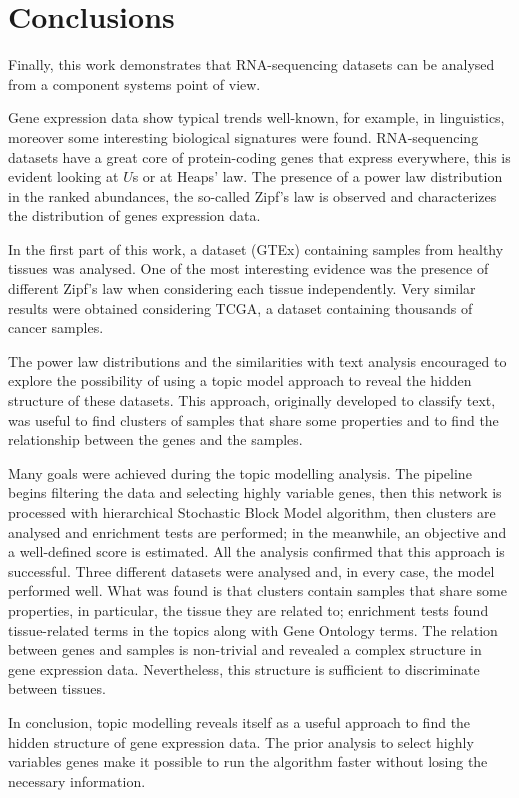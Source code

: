 \chapter{Conclusions}\label{ch:conclusions}
Finally, this work demonstrates that RNA-sequencing datasets can be analysed from a component systems point of view.

Gene expression data show typical trends well-known, for example, in linguistics, moreover some interesting biological signatures were found. RNA-sequencing datasets have a great core of protein-coding genes that express everywhere, this is evident looking at $U$s or at Heaps' law. The presence of a power law distribution in the ranked abundances, the so-called Zipf's law is observed and characterizes the distribution of genes expression data.

In the first part of this work, a dataset (GTEx) containing samples from healthy tissues was analysed. One of the most interesting evidence was the presence of different Zipf's law when considering each tissue independently. Very similar results were obtained considering TCGA, a dataset containing thousands of cancer samples.

The power law distributions and the similarities with text analysis encouraged to explore the possibility of using a topic model approach to reveal the hidden structure of these datasets. This approach, originally developed to classify text, was useful to find clusters of samples that share some properties and to find the relationship between the genes and the samples.

Many goals were achieved during the topic modelling analysis. The pipeline begins filtering the data and selecting highly variable genes, then this network is processed with hierarchical Stochastic Block Model algorithm, then clusters are analysed and enrichment tests are performed; in the meanwhile, an objective and a well-defined score is estimated. All the analysis confirmed that this approach is successful. Three different datasets were analysed and, in every case, the model performed well. What was found is that clusters contain samples that share some properties, in particular, the tissue they are related to; enrichment tests found tissue-related terms in the topics along with Gene Ontology terms. The relation between genes and samples is non-trivial and revealed a complex structure in gene expression data. Nevertheless, this structure is sufficient to discriminate between tissues.

In conclusion, topic modelling reveals itself as a useful approach to find the hidden structure of gene expression data. The prior analysis to select highly variables genes make it possible to run the algorithm faster without losing the necessary information.

